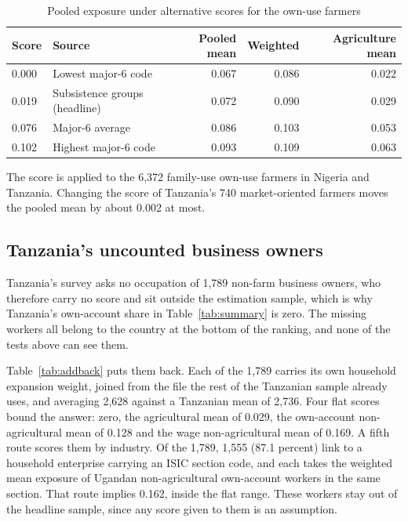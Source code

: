 \begin{table}[ht]
\centering
\caption{Pooled exposure under alternative scores for the own-use farmers}
\label{tab:imputed}
\footnotesize
\begin{tabular}{llrrr}
\toprule
Score & Source & Pooled mean & Weighted & Agriculture mean \\
\midrule
0.000 & Lowest major-6 code       & 0.067 & 0.086 & 0.022 \\
0.019 & Subsistence groups (headline) & 0.072 & 0.090 & 0.029 \\
0.076 & Major-6 average           & 0.086 & 0.103 & 0.053 \\
0.102 & Highest major-6 code      & 0.093 & 0.109 & 0.063 \\
\bottomrule
\end{tabular}

\vspace{4pt}
\begin{minipage}{0.9\linewidth}
\footnotesize
The score is applied to the 6,372 family-use own-use farmers in Nigeria and
Tanzania. Changing the score of Tanzania's 740 market-oriented farmers moves 
the pooled mean by about 0.002 at most.
\end{minipage}
\end{table}

\subsection{Tanzania's uncounted business owners}
\label{sec:addback}

Tanzania's survey asks no occupation of 1,789 non-farm
business owners, who therefore carry no score and sit outside the estimation
sample, which is why Tanzania's own-account share in Table~\ref{tab:summary} is
zero. The missing workers all belong to the country at the bottom of the
ranking, and none of the tests above can see them.

Table~\ref{tab:addback} puts them back. Each of the 1,789 carries its own
household expansion weight, joined from the file the rest of the Tanzanian
sample already uses, and averaging 2,628 against a Tanzanian mean of 2,736.
Four flat scores bound the answer: zero, the agricultural mean of 0.029, the
own-account non-agricultural mean of 0.128 and the wage non-agricultural mean
of 0.169. A fifth route scores them by industry. Of the 1,789, 1,555 (87.1
percent) link to a household enterprise carrying an ISIC section code, and each
takes the weighted mean exposure of Ugandan non-agricultural own-account
workers in the same section. That route implies 0.162, inside the flat range.
These workers stay out of the headline sample, since any score given to them is
an assumption.

